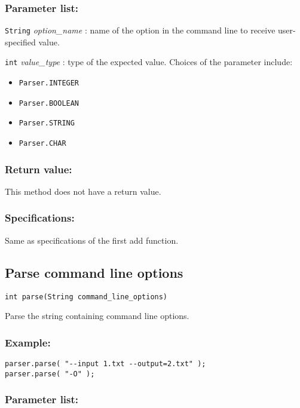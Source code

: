 \documentclass{article}
\begin{document}
\subsubsection*{Parameter list:}

\lstinline{String} \textsl{option\_name} : name of the option in the command line to receive user-specified value.

\lstinline{int} \textsl{value\_type} : type of the expected value. Choices of the parameter include:
\begin{itemize}
\item \lstinline{Parser.INTEGER}
\item \lstinline{Parser.BOOLEAN}
\item \lstinline{Parser.STRING}
\item \lstinline{Parser.CHAR}
\end{itemize}

\subsubsection*{Return value:}

This method does not have a return value.

\subsubsection*{Specifications:}

Same as specifications of the first add function.

\subsection{Parse command line options}
\begin{lstlisting}
int parse(String command_line_options)
\end{lstlisting}

Parse the string containing command line options.

\subsubsection*{Example:}
\begin{lstlisting}
parser.parse( "--input 1.txt --output=2.txt" );
parser.parse( "-O" );
\end{lstlisting}

\subsubsection*{Parameter list:}
\end{document}
